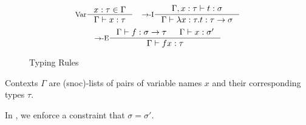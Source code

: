 \begin{figure*}[h]
  \[
    \inference[Var]{x : \tau \in \Gamma}
                   {\Gamma \vdash x : \tau}
    \quad
    \inference[\Intro{$\to$}]{\Gamma, x : \tau \vdash t : \sigma}
                             {\Gamma \vdash \lambda x : \tau. t : \tau \to \sigma}
  \]
  \[
    \inference[\Elim{$\to$}]{\Gamma \vdash f : \sigma \to \tau & \Gamma \vdash x : \sigma'}
                            {\Gamma \vdash f x : \tau}
  \]

  \caption*{Typing Rules}
  \label{fig:type-mvar-stlc-typing}
\end{figure*}

Contexts $\Gamma$ are (snoc)-lists of pairs of variable names $x$ and their corresponding types $\tau$.

In \Elim{$\to$}, we enforce a constraint that $\sigma = \sigma'$.
